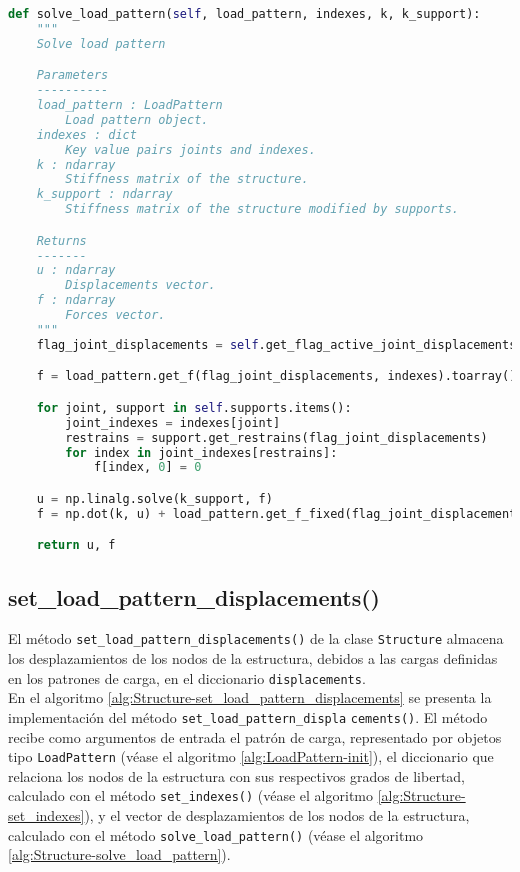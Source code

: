 \begin{lstlisting}[language=Python,caption=Método \texttt{solve\_load\_pattern()} de la clase \texttt{Structure}.,label=alg:Structure-solve_load_pattern, frame=single]
def solve_load_pattern(self, load_pattern, indexes, k, k_support):
    """
    Solve load pattern

    Parameters
    ----------
    load_pattern : LoadPattern
        Load pattern object.
    indexes : dict
        Key value pairs joints and indexes.
    k : ndarray
        Stiffness matrix of the structure.
    k_support : ndarray
        Stiffness matrix of the structure modified by supports.

    Returns
    -------
    u : ndarray
        Displacements vector.
    f : ndarray
        Forces vector.
    """
    flag_joint_displacements = self.get_flag_active_joint_displacements()

    f = load_pattern.get_f(flag_joint_displacements, indexes).toarray()

    for joint, support in self.supports.items():
        joint_indexes = indexes[joint]
        restrains = support.get_restrains(flag_joint_displacements)
        for index in joint_indexes[restrains]:
            f[index, 0] = 0

    u = np.linalg.solve(k_support, f)
    f = np.dot(k, u) + load_pattern.get_f_fixed(flag_joint_displacements, indexes).toarray()

    return u, f
\end{lstlisting}

\subsection{set\_load\_pattern\_displacements()}

El método \verb|set_load_pattern_displacements()| de la clase \verb|Structure| almacena los desplazamientos de los nodos de la estructura, debidos a las cargas definidas en los patrones de carga, en el diccionario \verb|displacements|.\\

En el algoritmo \ref{alg:Structure-set_load_pattern_displacements} se presenta la implementación del método \verb|set_load_pattern_displa| \verb|cements()|. El método recibe como argumentos de entrada el patrón de carga, representado por objetos tipo \verb|LoadPattern| (véase el algoritmo \ref{alg:LoadPattern-init}), el diccionario que relaciona los nodos de la estructura con sus respectivos grados de libertad, calculado con el método \verb|set_indexes()| (véase el algoritmo \ref{alg:Structure-set_indexes}), y el vector de desplazamientos de los nodos de la estructura, calculado con el método \verb|solve_load_pattern()| (véase el algoritmo \ref{alg:Structure-solve_load_pattern}).\\

